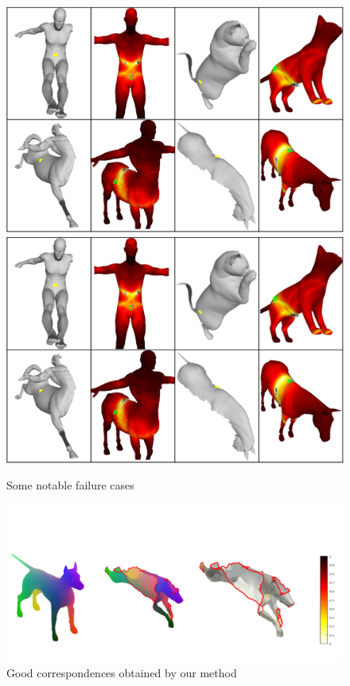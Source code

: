 \documentclass[10pt,twocolumn,letterpaper]{article}
\begin{document}
\begin{figure}[htb]
	\centering
	\ifpdf
	\includegraphics[width=1\textwidth]{figures/failures.png}
	\else
	\includegraphics[width=1\textwidth]{figures/failures.png}
	\fi
	\caption{Some notable failure cases}
\end{figure}
{\small


}

\begin{figure}[htb]
	\centering

	\includegraphics[width=1\textwidth]{figures/success_1}
	\caption{Good correspondences obtained by our method}
\end{figure}
\end{document}

